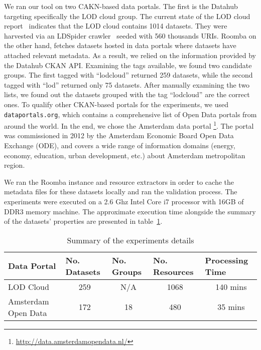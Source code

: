 We ran our tool on two CAKN-based data portals. The first is the Datahub targeting specifically the LOD cloud group. The current state of the LOD cloud report~\cite{Schmachtenberg:ISWC:14} indicates that the LOD cloud contains 1014 datasets. They were harvested via an LDSpider crawler~\cite{Isele:ISWC:10} seeded with 560 thousands URIs. Roomba on the other hand, fetches datasets hosted in data portals where datasets have attached relevant metadata. As a result, we relied on the information provided by the Datahub CKAN API. Examining the tags available, we found two candidate groups. The first tagged with ``lodcloud'' returned 259 datasets, while the second tagged with ``lod'' returned only 75 datasets. After manually examining the two lists, we found out the datasets grouped with the tag ``lodcloud'' are the correct ones. To qualify other CKAN-based portals for the experiments, we used \texttt{dataportals.org}, which contains a comprehensive list of Open Data portals from around the world. In the end, we chose the Amsterdam data portal \footnote{\url{http://data.amsterdamopendata.nl/}}. The portal was commissioned in 2012 by the Amsterdam Economic Board Open Data Exchange (ODE), and covers a wide range of information domains (energy, economy, education, urban development, etc.) about Amsterdam metropolitan region.

We ran the Roomba instance and resource extractors in order to cache the metadata files for these datasets locally and ran the validation process. The experiments were executed on a 2.6 Ghz Intel Core i7 processor with 16GB of DDR3 memory machine. The approximate execution time alongside the summary of the datasets' properties are presented in table~\ref{table:data_portals_experiments}.

\begin{table}[ht]
\centering
\begin{tabular}{|l|c|c|c|c|}
\hline
Data Portal         & \multicolumn{1}{l|}{No. Datasets} & \multicolumn{1}{l|}{No. Groups} & \multicolumn{1}{l|}{No. Resources} & \multicolumn{1}{l|}{Processing Time} \\ \hline
LOD Cloud           & 259                               & N/A                            & 1068                               & ~140 mins                            \\ \hline
Amsterdam Open Data & 172                               & 18                             & 480                                & ~35 mins                             \\ \hline
\end{tabular}
\caption{Summary of the experiments details}
\label{table:data_portals_experiments}
\end{table}

